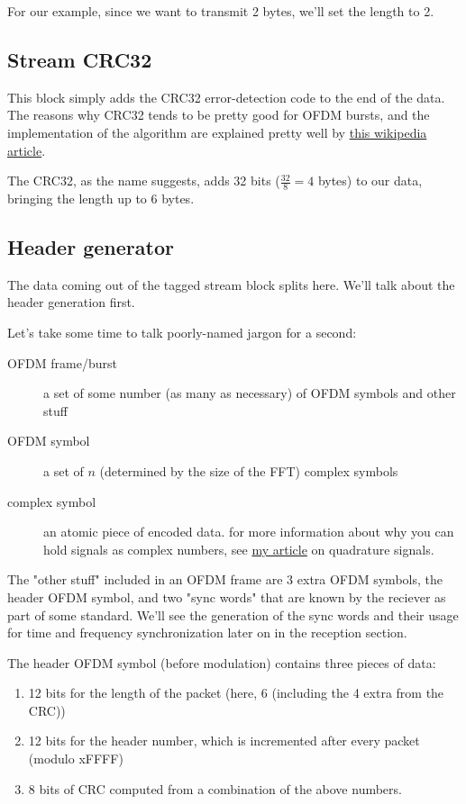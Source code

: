 \documentclass[11pt]{article}
\begin{document}
For our example, since we want to transmit 2 bytes, we'll set the
length to 2.

\subsection{Stream CRC32}
\label{sec:orgc33ea1f}
This block simply adds the CRC32 error-detection code to the end of
the data. The reasons why CRC32 tends to be pretty good for OFDM
bursts, and the implementation of the algorithm are explained pretty
well by \href{https://en.wikipedia.org/wiki/Cyclic\_redundancy\_check}{this wikipedia article}.

The CRC32, as the name suggests, adds 32 bits (\(\frac{32}{8} = 4\)
bytes) to our data, bringing the length up to 6 bytes.

\subsection{Header generator}
\label{sec:org3a6bdf6}
The data coming out of the tagged stream block splits here. We'll talk
about the header generation first.

Let's take some time to talk poorly-named jargon for a second:

\begin{description}
\item[{OFDM frame/burst}] a set of some number (as many as necessary) of
OFDM symbols and other stuff
\item[{OFDM symbol}] a set of \(n\) (determined by the size of the FFT)
complex symbols
\item[{complex symbol}] an atomic piece of encoded data. for more
information about why you can hold signals as complex numbers, see
\href{https://notes.esrh.me/quadrature\_signal.html}{my article} on quadrature signals.
\end{description}

The "other stuff" included in an OFDM frame are 3 extra OFDM symbols,
the header OFDM symbol, and two "sync words" that are known by the
reciever as part of some standard. We'll see the generation of the
sync words and their usage for time and frequency synchronization
later on in the reception section.

The header OFDM symbol (before modulation) contains three pieces of data:
\begin{enumerate}
\item 12 bits for the length of the packet (here, 6 (including the 4 extra from the CRC))
\item 12 bits for the header number, which is incremented after every packet (modulo xFFFF)
\item 8 bits of CRC computed from a combination of the above numbers.
\end{enumerate}
\end{document}
